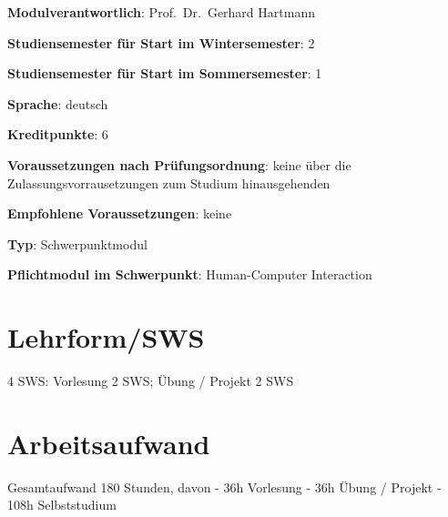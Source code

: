 \begin{modulHead}
\textbf{Modulverantwortlich}: Prof.~Dr.~Gerhard
Hartmann
\end{modulHead}
\begin{modulHead}
\textbf{Studiensemester für
Start im Wintersemester}:
2
\end{modulHead}
\begin{modulHead}
\textbf{Studiensemester für Start
im Sommersemester}:
1
\end{modulHead}
\begin{modulHead}
\textbf{Sprache}:
deutsch
\end{modulHead}
\begin{modulHead}
\textbf{Kreditpunkte}:
6
\end{modulHead}
\begin{modulHead}
\textbf{Voraussetzungen nach
Prüfungsordnung}: keine über die Zulassungsvorrausetzungen zum Studium
hinausgehenden
\end{modulHead}
\begin{modulHead}
\textbf{Empfohlene
Voraussetzungen}: keine
\end{modulHead}
\begin{modulHead}
\textbf{Typ}:
Schwerpunktmodul
\end{modulHead}
\begin{modulHead}
\textbf{Pflichtmodul
im Schwerpunkt}: Human-Computer Interaction
\end{modulHead}


\section*{Lehrform/SWS\label{/mi-2017/modulbeschreibungen-master/MA_HCI_Modul_Statistical_Methods_for_HCI}}\label{lehrformswspathlabelmi-2017modulbeschreibungen-mastermaux5fhciux5fmodulux5fstatisticalux5fmethodsux5fforux5fhci}

4 SWS: Vorlesung 2 SWS; Übung / Projekt 2 SWS

\section*{Arbeitsaufwand\label{/mi-2017/modulbeschreibungen-master/MA_HCI_Modul_Statistical_Methods_for_HCI}}\label{arbeitsaufwandpathlabelmi-2017modulbeschreibungen-mastermaux5fhciux5fmodulux5fstatisticalux5fmethodsux5fforux5fhci}

Gesamtaufwand 180 Stunden, davon - 36h Vorlesung - 36h Übung / Projekt -
108h Selbststudium


